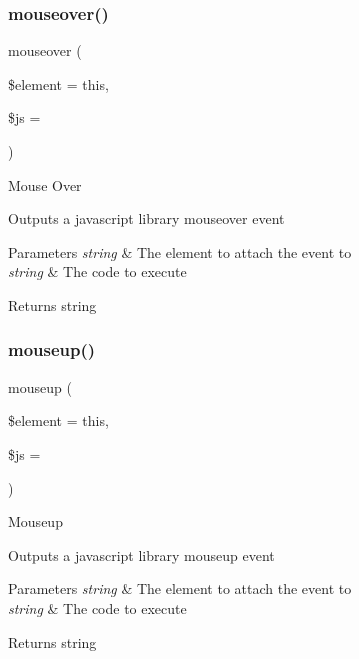 \subsubsection{\texorpdfstring{mouseover()}{mouseover()}}
{\footnotesize\ttfamily mouseover (\begin{DoxyParamCaption}\item[{}]{\$element = {\ttfamily \textquotesingle{}this\textquotesingle{}},  }\item[{}]{\$js = {\ttfamily \textquotesingle{}\textquotesingle{}} }\end{DoxyParamCaption})}

Mouse Over

Outputs a javascript library mouseover event


\begin{DoxyParams}{Parameters}
{\em string} & The element to attach the event to \\
\hline
{\em string} & The code to execute \\
\hline
\end{DoxyParams}
\begin{DoxyReturn}{Returns}
string 
\end{DoxyReturn}
\mbox{\label{class_c_i___javascript_a31b2b5c28657895274f5658517a2342a}} 
\subsubsection{\texorpdfstring{mouseup()}{mouseup()}}
{\footnotesize\ttfamily mouseup (\begin{DoxyParamCaption}\item[{}]{\$element = {\ttfamily \textquotesingle{}this\textquotesingle{}},  }\item[{}]{\$js = {\ttfamily \textquotesingle{}\textquotesingle{}} }\end{DoxyParamCaption})}

Mouseup

Outputs a javascript library mouseup event


\begin{DoxyParams}{Parameters}
{\em string} & The element to attach the event to \\
\hline
{\em string} & The code to execute \\
\hline
\end{DoxyParams}
\begin{DoxyReturn}{Returns}
string 
\end{DoxyReturn}
\mbox{\label{class_c_i___javascript_a95bc25e9063b14d257e97e4b205073ba}} 
